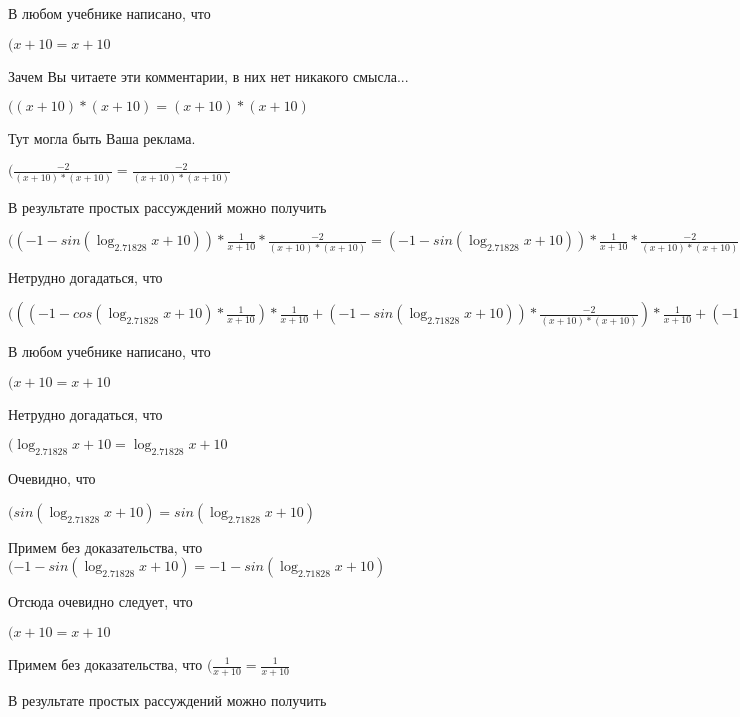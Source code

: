 \documentclass[12pt,a4paper,fleqn]{article}
\theoremstyle{definition}
\begin{document}
В любом учебнике написано, что

$( x  +  10  =  x  +  10 $

Зачем Вы читаете эти комментарии, в них нет никакого смысла...

$(( x  +  10 ) * ( x  +  10 ) = ( x  +  10 ) * ( x  +  10 )$

Тут могла быть Ваша реклама.

$(\frac{ -2 }{( x  +  10 ) * ( x  +  10 )}
 = \frac{ -2 }{( x  +  10 ) * ( x  +  10 )}
$

В результате простых рассуждений можно получить

$(( -1  - sin(\log_{ 2.71828 }{ x  +  10 })) * \frac{ 1 }{ x  +  10 }
 * \frac{ -2 }{( x  +  10 ) * ( x  +  10 )}
 = ( -1  - sin(\log_{ 2.71828 }{ x  +  10 })) * \frac{ 1 }{ x  +  10 }
 * \frac{ -2 }{( x  +  10 ) * ( x  +  10 )}
$

Нетрудно догадаться, что

$((( -1  - cos(\log_{ 2.71828 }{ x  +  10 }) * \frac{ 1 }{ x  +  10 }
) * \frac{ 1 }{ x  +  10 }
 + ( -1  - sin(\log_{ 2.71828 }{ x  +  10 })) * \frac{ -2 }{( x  +  10 ) * ( x  +  10 )}
) * \frac{ 1 }{ x  +  10 }
 + ( -1  - sin(\log_{ 2.71828 }{ x  +  10 })) * \frac{ 1 }{ x  +  10 }
 * \frac{ -2 }{( x  +  10 ) * ( x  +  10 )}
 = (( -1  - cos(\log_{ 2.71828 }{ x  +  10 }) * \frac{ 1 }{ x  +  10 }
) * \frac{ 1 }{ x  +  10 }
 + ( -1  - sin(\log_{ 2.71828 }{ x  +  10 })) * \frac{ -2 }{( x  +  10 ) * ( x  +  10 )}
) * \frac{ 1 }{ x  +  10 }
 + ( -1  - sin(\log_{ 2.71828 }{ x  +  10 })) * \frac{ 1 }{ x  +  10 }
 * \frac{ -2 }{( x  +  10 ) * ( x  +  10 )}
$

В любом учебнике написано, что

$( x  +  10  =  x  +  10 $

Нетрудно догадаться, что

$(\log_{ 2.71828 }{ x  +  10 } = \log_{ 2.71828 }{ x  +  10 }$

Очевидно, что

$(sin(\log_{ 2.71828 }{ x  +  10 }) = sin(\log_{ 2.71828 }{ x  +  10 })$

Примем без доказательства, что
$( -1  - sin(\log_{ 2.71828 }{ x  +  10 }) =  -1  - sin(\log_{ 2.71828 }{ x  +  10 })$

Отсюда очевидно следует, что

$( x  +  10  =  x  +  10 $

Примем без доказательства, что
$(\frac{ 1 }{ x  +  10 }
 = \frac{ 1 }{ x  +  10 }
$

В результате простых рассуждений можно получить
\end{document}
